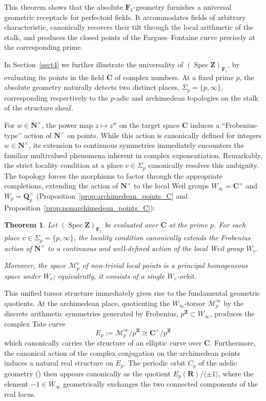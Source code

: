 \documentclass[11pt,a4paper]{article}
\newtheorem{thm}{Theorem}
\newcommand{\C}{\mathbf{C}}
\newcommand{\N}{\mathbf{N}}
\newcommand{\Q}{\mathbf{Q}}
\newcommand{\R}{\mathbf{R}}
\newcommand{\Z}{\mathbf{Z}}
\newcommand{\Fone}{\mathbf{F}_{1}}
\def\spzf{(\Spec \Z)_{\mathbf{F}_{1}}}
\newcommand{\Spec}{\operatorname{Spec}}
\begin{document}
This theorem shows that the absolute $\Fone$-geometry furnishes a universal geometric receptacle for perfectoid fields. It accommodates fields of arbitrary characteristic, canonically recovers their tilt through the local arithmetic of the stalk, and produces the closed points of the Fargues–Fontaine curve precisely at the corresponding prime.\vspace{.03in}



In Section~\ref{sect4} we  further illustrate the universality of $\spzf$, by evaluating its  points in the field $\C$ of complex numbers. At a fixed prime $p$, the absolute geometry naturally detects two distinct places,
$\Sigma_p=\{p,\infty\}$,
corresponding respectively to the $p$-adic and archimedean topologies on the stalk of the structure sheaf. %

For $w\in\N^\times$, the power map $z\mapsto z^w$ on the target space $\C$ induces a ``Frobenius-type’’ action of $\N^\times$ on points. 
While this action is canonically defined for integers $w\in\N^\times$, its extension to continuous symmetries immediately encounters the familiar multivalued phenomena inherent in complex exponentiation.
Remarkably, the strict locality condition at a place $v \in \Sigma_p$ canonically resolves this ambiguity. The topology forces the morphisms to factor through the appropriate completions, extending the  action of $\N^\times$ to the  local Weil groups $W_\infty = \C^\times$ and $W_p = \Q_p^\times$ (Proposition~\ref{prop:archimedean_points_C} and Proposition~\ref{prop:nonarchimedean_points_C}): 

\begin{thm}\label{WeilGroupAction}
Let  $\spzf$ be evaluated over $\C$ at the prime $p$. For each place
$v\in\Sigma_p=\{p,\infty\}$,
the locality condition canonically extends the Frobenius action of $\N^\times$ to a continuous and well-defined action of the local Weil group $W_v$. 

Moreover, the space $\mathcal M_p^v$ of non-trivial local points is a principal homogeneous space under $W_v$; equivalently, it consists of a single $W_v$-orbit.
\end{thm}





This unified torsor structure immediately gives rise to the fundamental geometric quotients. At the archimedean place, quotienting the $W_\infty$-torsor $\mathcal M_p^\infty$ by the discrete arithmetic symmetries generated by Frobenius,
$p^\Z \subset W_\infty$,
produces the complex Tate curve
\begin{equation}\label{tatec}
E_p:=\mathcal M_p^\infty/p^\Z \cong \C^\times/p^\Z
\end{equation} 
which canonically carries the structure of an elliptic curve over $\C$.
Furthermore, the canonical action of the complex conjugation on the archimedean points induces a natural real structure on $E_p$. The periodic orbit $C_p$ of the adelic geometry (\cite{CC3,CC6}) then appears canonically as the quotient
$E_p(\R)/\langle \pm 1\rangle$,
where the  element
$-1\in W_\infty$
geometrically exchanges the two connected components of the real locus.
\end{document}
